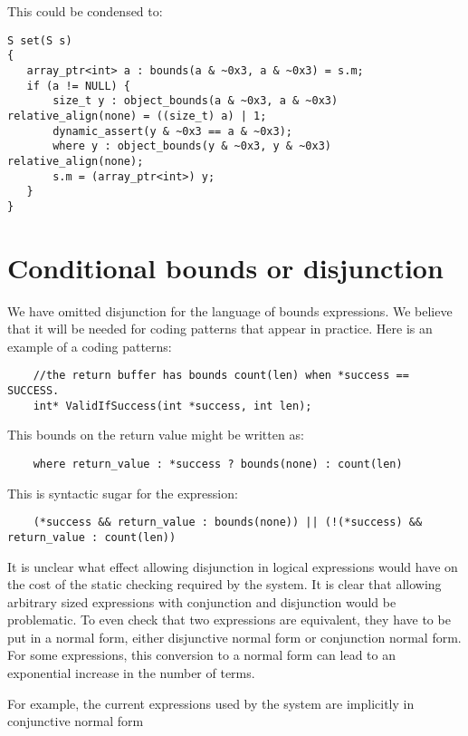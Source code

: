 This could be condensed to:
\begin{verbatim}
S set(S s) 
{
   array_ptr<int> a : bounds(a & ~0x3, a & ~0x3) = s.m;
   if (a != NULL) {
       size_t y : object_bounds(a & ~0x3, a & ~0x3) relative_align(none) = ((size_t) a) | 1;
       dynamic_assert(y & ~0x3 == a & ~0x3);
       where y : object_bounds(y & ~0x3, y & ~0x3) relative_align(none);
       s.m = (array_ptr<int>) y;
   }
} 
\end{verbatim}

\section{Conditional bounds or disjunction}\label{conditional-bounds-or-disjunction}

We have omitted disjunction for the language of bounds expressions. We
believe that it will be needed for coding patterns that appear in
practice. Here is an example of a coding patterns:

\begin{verbatim}
    //the return buffer has bounds count(len) when *success == SUCCESS.
    int* ValidIfSuccess(int *success, int len); 
\end{verbatim}

This bounds on the return value might be written as:
\begin{verbatim}
    where return_value : *success ? bounds(none) : count(len)
\end{verbatim}

This is syntactic sugar for the expression:

\begin{verbatim}
    (*success && return_value : bounds(none)) || (!(*success) && return_value : count(len))
\end{verbatim}

It is unclear what effect allowing disjunction in logical expressions
would have on the cost of the static checking required by the system. It
is clear that allowing arbitrary sized expressions with conjunction and
disjunction would be problematic. To even check that two expressions are
equivalent, they have to be put in a normal form, either disjunctive
normal form or conjunction normal form. For some expressions, this
conversion to a normal form can lead to an exponential increase in the
number of terms.

For example, the current expressions used by the system are implicitly
in conjunctive normal form

